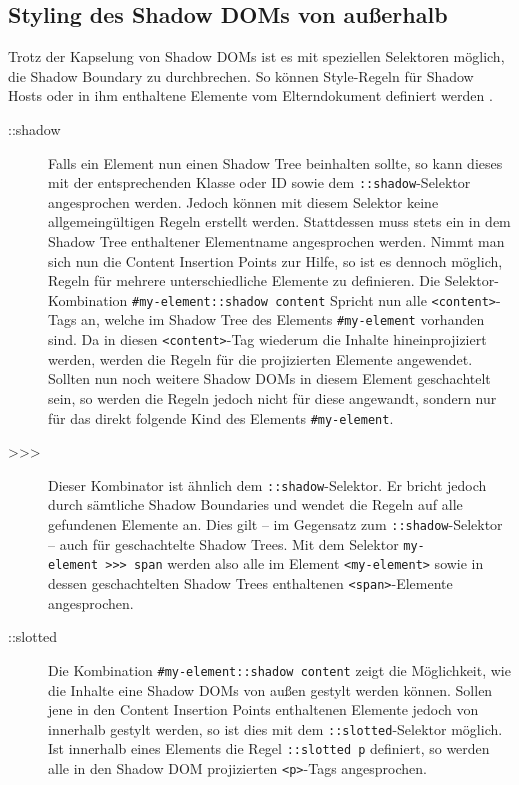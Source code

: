 \subsection{Styling des Shadow DOMs von außerhalb}\label{styling-des-shadow-dom-von-ausserhalb}

Trotz der Kapselung von Shadow \ac{DOM}s ist es mit speziellen Selektoren möglich, die Shadow Boundary zu durchbrechen. So können Style-Regeln für Shadow Hosts oder in ihm enthaltene Elemente vom Elterndokument definiert werden \cite{citeulike:13883067}.

\begin{description}
  \item[::shadow] Falls ein Element nun einen Shadow Tree beinhalten sollte, so kann dieses mit der entsprechenden Klasse oder ID sowie dem \texttt{::shadow}-Selektor angesprochen werden. Jedoch können mit diesem Selektor keine allgemeingültigen Regeln erstellt werden. Stattdessen muss stets ein in dem Shadow Tree enthaltener Elementname angesprochen werden. Nimmt man sich nun die Content Insertion Points zur Hilfe, so ist es dennoch möglich, Regeln für mehrere unterschiedliche Elemente zu definieren. Die Selektor-Kombination \texttt{\#my-element::shadow\ content} Spricht nun alle \texttt{\textless{}content\textgreater{}}-Tags an, welche im Shadow Tree des Elements \texttt{\#my-element} vorhanden sind. Da in diesen \texttt{\textless{}content\textgreater{}}-Tag wiederum die Inhalte hineinprojiziert werden, werden die Regeln für die projizierten Elemente angewendet. Sollten nun noch weitere Shadow \ac{DOM}s in diesem Element geschachtelt sein, so werden die Regeln jedoch nicht für diese angewandt, sondern nur für das direkt folgende Kind des Elements \texttt{\#my-element}.
  \item[\textgreater{}\textgreater{}\textgreater{}] Dieser Kombinator ist ähnlich dem \texttt{::shadow}-Selektor. Er bricht jedoch durch sämtliche Shadow Boundaries und wendet die Regeln auf alle gefundenen Elemente an. Dies gilt -- im Gegensatz zum \texttt{::shadow}-Selektor -- auch für geschachtelte Shadow Trees. Mit dem Selektor \texttt{my-element\ \textgreater{}\textgreater{}\textgreater{}\ span} werden also alle im Element \texttt{\textless{}my-element\textgreater{}} sowie in dessen geschachtelten Shadow Trees enthaltenen \texttt{\textless{}span\textgreater{}}-Elemente angesprochen.
  \item[::slotted] Die Kombination \texttt{\#my-element::shadow\ content} zeigt die Möglichkeit, wie die Inhalte eine Shadow \ac{DOM}s von außen gestylt werden können. Sollen jene in den Content Insertion Points enthaltenen Elemente jedoch von innerhalb gestylt werden, so ist dies mit dem \texttt{::slotted}-Selektor möglich. Ist innerhalb eines Elements die Regel \texttt{::slotted\ p} definiert, so werden alle in den Shadow \ac{DOM} projizierten \texttt{\textless{}p\textgreater{}}-Tags angesprochen.
\end{description}


